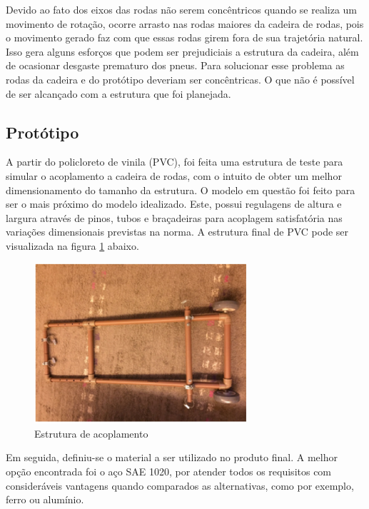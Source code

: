 Devido ao fato dos eixos das rodas não serem concêntricos quando se realiza um movimento de rotação, ocorre arrasto nas rodas maiores da cadeira de rodas, pois o movimento gerado faz com que essas rodas girem fora de sua trajetória natural. Isso gera alguns esforços que podem ser prejudiciais a estrutura da cadeira, além de ocasionar desgaste prematuro dos pneus. Para solucionar esse problema as rodas da cadeira e do protótipo deveriam ser concêntricas. O que não é possível de ser alcançado com a estrutura que foi planejada.

\subsection{Protótipo}

A partir do policloreto de vinila (PVC), foi feita uma estrutura de teste para simular o acoplamento a cadeira de rodas, com o intuito de obter um melhor dimensionamento do tamanho da estrutura. O modelo em questão foi feito para ser o mais próximo do modelo idealizado. Este, possui regulagens de altura e largura através de pinos, tubos e braçadeiras para acoplagem satisfatória nas variações dimensionais previstas na norma. A estrutura final de PVC pode ser visualizada na figura \ref{fig:acoplamento} abaixo.

\begin{figure}[!ht]
\centering
\includegraphics[width=0.7\textwidth]{figuras/resultados/acoplamento}
\caption{Estrutura de acoplamento}
\label{fig:acoplamento}
\end{figure}

Em seguida, definiu-se o material a ser utilizado no produto final. A melhor opção encontrada foi o aço SAE 1020, por atender todos os requisitos com consideráveis vantagens quando comparados as alternativas, como por exemplo, ferro ou alumínio.

